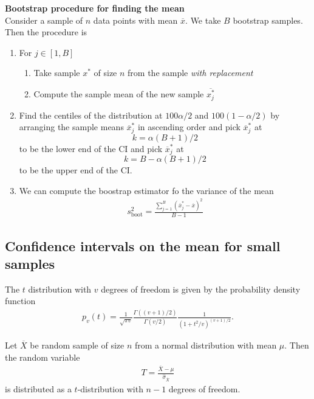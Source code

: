 \documentclass{article}
\begin{document}
\textbf{Bootstrap procedure for finding the mean}\\
Consider a sample of $n$ data points with mean
$\overline x$. We take $B$ bootstrap samples.
Then the procedure is
\begin{enumerate}
	\item For $j\in[1,B]$ \begin{enumerate}
		      \item Take sample $x^*$ of size $n$ from the sample \emph{with replacement}
		      \item Compute the sample mean of the new sample $\overline{x_j^*}$
	      \end{enumerate}
	\item Find the centiles of the distribution at $100\alpha/2$ and $100(1-\alpha/2)$
	      by arranging the sample means $\overline x^*_j$ in ascending order and pick
	      $\overline x^*_j$ at $$k=\alpha(B+1)/2$$ to be the lower end of the CI and pick
	      $\overline x^*_j$ at $$k=B-\alpha(B+1)/2$$ to be the upper end of the CI.
	\item We can compute the boostrap estimator fo the variance of the mean \begin{align*}
		      s^2_{\text{boot}} = \frac{\sum_{j=1}^B(\overline x_j^*-\overline x)^2}{B-1}
	      \end{align*}
\end{enumerate}

\subsection{Confidence intervals on the mean for small samples}

\begin{definition}
	The $t$ distribution with $v$ degrees of freedom is given by the
	probability density function
	\begin{align*}
		p_v(t)=\frac{1}{\sqrt{\pi v}}\frac{\Gamma((v+1)/2)}{\Gamma(v/2)}\frac{1}{(1+t^2/v)^{(v+1)/2}}.
	\end{align*}
\end{definition}

\begin{theorem}
	Let $\overline X$ be random sample of size $n$ from a normal distribution
	with mean $\mu$. Then the random variable
	\begin{align*}
		T=\frac{\overline X - \mu}{\hat\sigma_{\overline X}}
	\end{align*}
	is distributed as a $t$-distribution with $n-1$ degrees of freedom.
\end{theorem}
\end{document}
